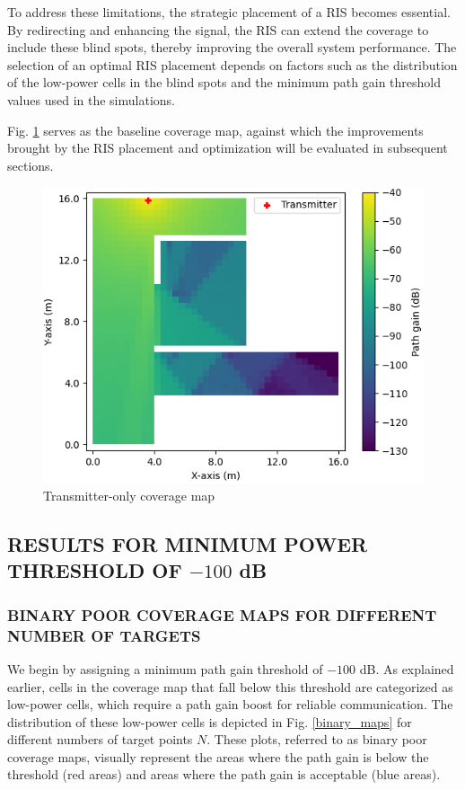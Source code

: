 \documentclass{IEEEoj}
\begin{document}
To address these limitations, the strategic placement of a RIS becomes essential. By redirecting and enhancing the signal, the RIS can extend the coverage to include these blind spots, thereby improving the overall system performance. The selection of an optimal RIS placement depends on factors such as the distribution of the low-power cells in the blind spots and the minimum path gain threshold values used in the simulations.

Fig. \ref{TX_coverage_map} serves as the baseline coverage map, against which the improvements brought by the RIS placement and optimization will be evaluated in subsequent sections.

\begin{figure}
	\centering \includegraphics[width=\linewidth]{Sim_Results/TX_coverage_map.png}
	\caption{Transmitter-only coverage map}
	\label{TX_coverage_map}
\end{figure}

\subsection{RESULTS FOR MINIMUM POWER THRESHOLD OF $-100$ dB}

\subsubsection{BINARY POOR COVERAGE MAPS FOR DIFFERENT NUMBER OF TARGETS}
We begin by assigning a minimum path gain threshold of $-100$ dB. As explained earlier, cells in the coverage map that fall below this threshold are categorized as low-power cells, which require a path gain boost for reliable communication. The distribution of these low-power cells is depicted in Fig. \ref{binary_maps} for different numbers of target points $N$. These plots, referred to as binary poor coverage maps, visually represent the areas where the path gain is below the threshold (red areas) and areas where the path gain is acceptable (blue areas).
\end{document}
